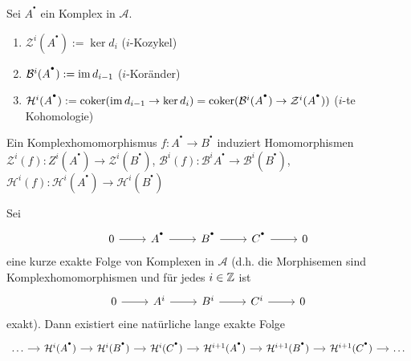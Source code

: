 \begin{df}
	Sei $A^{^\bullet}$ ein Komplex in $\mathcal{A}$.
	\begin{enumerate}
		\item[] $\mathcal{Z}^i(A^{^\bullet}):= \ker d_i$ \hfill ($i$-Kozykel)
		\item[] $\mathcal{B}^i(A^{^\bullet}) := \operatorname{im} d_{i-1}$ \hfill ($i$-Koränder)
		\item[] $\mathcal{H}^i(A^{^\bullet}) := \operatorname{coker} (\operatorname{im} d_{i-1} \to \ker d_i) = \operatorname{coker}(\mathcal{B}^i(A^{^\bullet}) \to \mathcal{Z}^i(A^{^\bullet}))$ \hfill ($i$-te Kohomologie)
	\end{enumerate}
\end{df}
\begin{anm}
	Ein Komplexhomomorphismus $f:A^{^\bullet} \to B^{^\bullet}$ induziert Homomorphismen $\mathcal{Z}^i(f): Z^i(A^{^\bullet}) \to \mathcal{Z}^i(B^{^\bullet})$, $\mathcal{B}^i(f): \mathcal{B}^iA^{^\bullet} \to \mathcal{B}^i (B^{^\bullet})$, $\mathcal{H}^i(f): \mathcal{H}^i(A^{^\bullet}) \to \mathcal{H}^i(B^{^\bullet})$
\end{anm}
\begin{sa}
	Sei $$\begin{tikzcd}
	0 \arrow{r} & A^{^\bullet} \arrow{r} & B^{^\bullet} \arrow{r} & C^{^\bullet} \arrow{r} & 0
	\end{tikzcd}$$
	eine kurze exakte Folge von Komplexen in $\mathcal{A}$ (d.h. die Morphisemen sind Komplexhomomorphismen und für jedes $i\in \mathbb{Z}$ ist 
	$$\begin{tikzcd}
	0 \arrow{r} & A^i \arrow{r} & B^i \arrow{r} & C^i \arrow{r} & 0
	\end{tikzcd}$$
	exakt). Dann existiert eine natürliche lange exakte Folge 
	$$\begin{tikzcd}[column sep = small]
	\ldots \arrow{r} & \mathcal{H}^i(A^{^\bullet}) \arrow{r} & \mathcal{H}^i(B^{^\bullet}) \arrow{r} & \mathcal{H}^i(C^{^\bullet}) \arrow{r} & \mathcal{H}^{i+1}(A^{^\bullet}) \arrow{r}& \mathcal{H}^{i+1}(B^{^\bullet}) \arrow{r} & \mathcal{H}^{i+1}(C^{^\bullet}) \arrow{r}& \ldots
	\end{tikzcd}$$
\end{sa}
